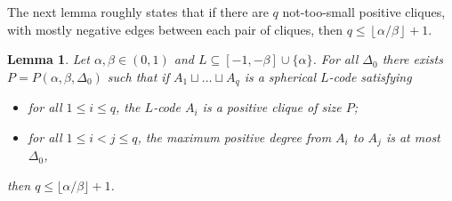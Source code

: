 \documentclass[reqno, 11pt]{amsart}
\newtheorem{lemma}[theorem]{Lemma}
\theoremstyle{definition}
\theoremstyle{remark}
\newcommand{\floor}[1]{\left\lfloor #1 \right\rfloor}
\begin{document}
The next lemma roughly states that if there are $q$ not-too-small positive cliques, with mostly negative edges between each pair of cliques, then $q \le \floor{\alpha/\beta} + 1$.

\begin{lemma}\label{lem:many-cliques}
    Let $\alpha, \beta \in (0,1)$ and $L \subseteq [-1,-\beta]\cup\{\alpha\}$. For all $\Delta_0$ there exists $P = P(\alpha, \beta, \Delta_0)$ such that if $A_1 \sqcup \ldots \sqcup A_q$ is a spherical $L$-code satisfying 

    \begin{itemize}
        \item[(a)] for all $1 \leq i \leq q$, the $L$-code $A_i$ is a positive clique of size $P$;
    
        \item[(b)] for all $1 \leq i < j \leq q$, the maximum positive degree from $A_i$ to $A_j$ is at most $\Delta_0$,
    \end{itemize}
    then $q \leq \lfloor \alpha/\beta\rfloor + 1$.
\end{lemma}
\end{document}
